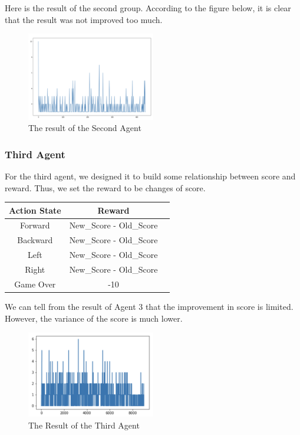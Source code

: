 \documentclass{article}
\begin{document}
Here is the result of the second group. According to the figure below, it is clear that the result was not improved too much. 


\begin{figure}[h]
\caption{The result of the Second Agent}
\centering
\includegraphics[width=0.5\textwidth]{SecondAgent.png}
\end{figure}

\subsubsection{Third Agent}
For the third agent, we designed it to build some relationship between score and reward. Thus, we set the reward to be changes of score.


\begin{center}
\begin{tabular}{ | c | c| c | } 
\hline
Action State & Reward\\ 
\hline
Forward & New\_Score - Old\_Score\\ 
\hline
Backward & New\_Score - Old\_Score\\ 
\hline
Left & New\_Score - Old\_Score\\ 
\hline
Right & New\_Score - Old\_Score\\ 
\hline
Game Over & -10\\ 
\hline
\end{tabular}
\end{center}

We can tell from the result of Agent 3 that the improvement in score is limited. However, the variance of the score is much lower. 

\begin{figure}[H]
\caption{The Result of the Third Agent}
\centering
\includegraphics[width=0.5\textwidth]{ThirdAgent.png}
\end{figure}
\end{document}
